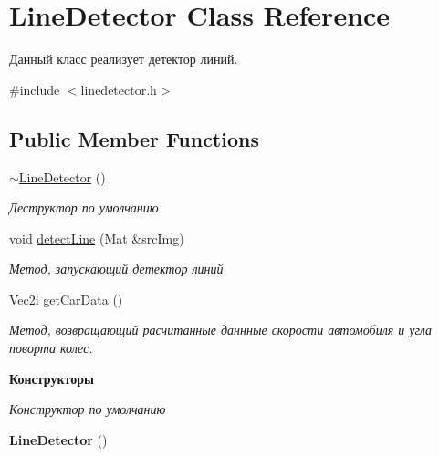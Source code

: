 \hypertarget{class_line_detector}{\section{Line\+Detector Class Reference}
\label{class_line_detector}
}


Данный класс реализует детектор линий.  




{\ttfamily \#include $<$linedetector.\+h$>$}

\subsection*{Public Member Functions}
\begin{DoxyCompactItemize}
\item 
\hyperlink{class_line_detector_a556657ccf8bd36178c99ad92bcec5a97}{$\sim$\+Line\+Detector} ()
\begin{DoxyCompactList}\small\item\em Деструктор по умолчанию \end{DoxyCompactList}\item 
void \hyperlink{class_line_detector_aeaab653f2ebb44d55f985143070515f6}{detect\+Line} (Mat \&src\+Img)
\begin{DoxyCompactList}\small\item\em Метод, запускающий детектор линий \end{DoxyCompactList}\item 
Vec2i \hyperlink{class_line_detector_ac08b6ad11cc4092b49dc7ee62a3ead38}{get\+Car\+Data} ()
\begin{DoxyCompactList}\small\item\em Метод, возвращающий расчитанные даннные скорости автомобиля и угла поворта колес. \end{DoxyCompactList}\end{DoxyCompactItemize}
\begin{Indent}{\bf Конструкторы}\par
{\em Конструктор по умолчанию }\begin{DoxyCompactItemize}
\item 
\hypertarget{class_line_detector_a39b34cdd80ad5d706b276bdf0b50c744}{{\bfseries Line\+Detector} ()}\label{class_line_detector_a39b34cdd80ad5d706b276bdf0b50c744}

\end{DoxyCompactItemize}
\end{Indent}


